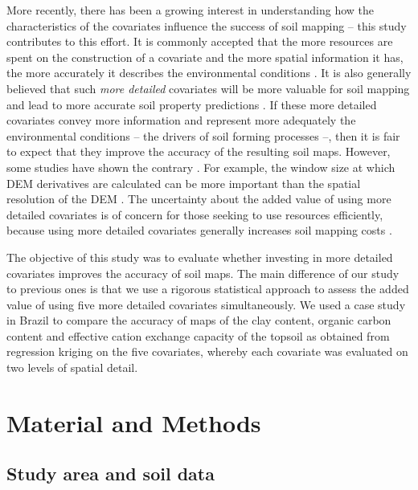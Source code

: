 More recently, there has been a growing interest in understanding how the characteristics of the covariates 
influence the success of soil mapping -- this study contributes to this effort. It is commonly accepted that 
the more resources are spent on the construction of a covariate and the more spatial information it has, the 
more accurately it describes the environmental conditions \cite{HupyEtAl2004, HenglEtAl2013a}. It is also 
generally believed that such \emph{more detailed} covariates will be more valuable for soil mapping and lead to 
more accurate soil property predictions \cite{CavazziEtAl2013, MaynardEtAl2014}. If these more detailed 
covariates convey more information and represent more adequately the environmental conditions -- the drivers of 
soil forming processes --, then it is fair to expect that they improve the accuracy of the resulting soil maps. 
However, some studies have shown the contrary \cite{ThompsonEtAl2001, EldeiryEtAl2008, KimEtAl2014}. For 
example, the window size at which DEM derivatives are calculated can be more important than the spatial 
resolution of the DEM \cite{Wood1996, ZhuEtAl2008, BehrensEtAl2010a}. The uncertainty about the added value of 
using more detailed covariates is of concern for those seeking to use resources efficiently, because using more 
detailed covariates generally increases soil mapping costs \cite{ShiEtAl2012}.

The objective of this study was to evaluate whether investing in more detailed covariates improves the accuracy 
of soil maps. The main difference of our study to previous ones is that we use a rigorous statistical approach 
to assess the added value of using five more detailed covariates simultaneously. We used a case study in Brazil 
to compare the accuracy of maps of the clay content, organic carbon content and effective cation exchange 
capacity of the topsoil as obtained from regression kriging on the five covariates, whereby each covariate was 
evaluated on two levels of spatial detail.

\section{Material and Methods}
\label{sec:chap05-methods}

\subsection{Study area and soil data}
\label{subsec:chap05-soil-data}


